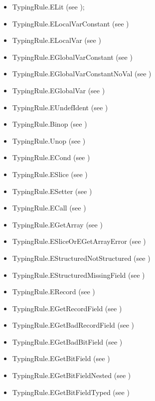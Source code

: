 \documentclass{book}
\begin{document}
\begin{itemize}
\item TypingRule.ELit (see );
\item TypingRule.ELocalVarConstant (see )
\item TypingRule.ELocalVar (see )
\item TypingRule.EGlobalVarConstant (see )
\item TypingRule.EGlobalVarConstantNoVal (see )
\item TypingRule.EGlobalVar (see )
\item TypingRule.EUndefIdent (see )
\item TypingRule.Binop (see )
\item TypingRule.Unop (see )
\item TypingRule.ECond (see )
\item TypingRule.ESlice (see )
\item TypingRule.ESetter (see )
\item TypingRule.ECall (see )
\item TypingRule.EGetArray (see )
\item TypingRule.ESliceOrEGetArrayError (see )
\item TypingRule.EStructuredNotStructured (see )
\item TypingRule.EStructuredMissingField (see )
\item TypingRule.ERecord (see )
\item TypingRule.EGetRecordField (see )
\item TypingRule.EGetBadRecordField (see )
\item TypingRule.EGetBadBitField (see )
\item TypingRule.EGetBitField (see )
\item TypingRule.EGetBitFieldNested (see )
\item TypingRule.EGetBitFieldTyped (see )

\end{itemize}
\end{document}
